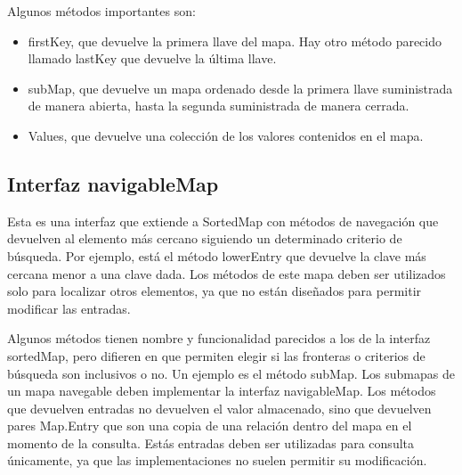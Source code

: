 \documentclass[11pt]{article}
\begin{document}
\begin{itemize}
\par

Algunos métodos importantes son:

\begin{itemize}

\item firstKey, que devuelve la primera llave del mapa. Hay otro 
método parecido llamado lastKey que devuelve la última llave.

\item subMap, que devuelve un mapa ordenado desde la primera llave 
suministrada de manera abierta, hasta la segunda suministrada de 
manera cerrada.

\item Values, que devuelve una colección de los valores contenidos en 
el mapa.

\end{itemize}

\end{itemize}

\subsection{Interfaz navigableMap}

\par

Esta es una interfaz que extiende a SortedMap con métodos de 
navegación que devuelven al elemento más cercano siguiendo un 
determinado criterio de búsqueda. Por ejemplo, está el método 
lowerEntry que devuelve la clave más cercana menor a una clave dada. 
Los métodos de este mapa deben ser utilizados solo para localizar 
otros elementos, ya que no están diseñados para permitir modificar 
las entradas. 

\par

Algunos métodos tienen nombre y funcionalidad parecidos a los de la 
interfaz sortedMap, pero difieren en que permiten elegir si las 
fronteras o criterios de búsqueda son inclusivos o no. Un ejemplo es 
el método subMap. Los submapas de un mapa navegable deben implementar 
la interfaz navigableMap. Los métodos que devuelven entradas no 
devuelven el valor almacenado, sino que devuelven pares Map.Entry que 
son una copia de una relación dentro del mapa en el momento de la 
consulta. Estás entradas deben ser utilizadas para consulta 
únicamente, ya que las implementaciones no suelen permitir su 
modificación.

\par
\end{document}
